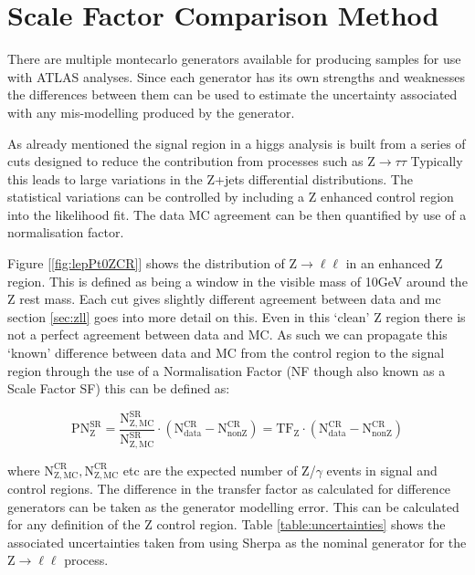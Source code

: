 \section{Scale Factor Comparison Method}
\label{sec:comparison}

There are multiple montecarlo generators available for producing samples for use with ATLAS analyses. Since each generator has its own strengths and weaknesses the differences between them can be used to estimate the uncertainty associated with any mis-modelling produced by the generator.

As already mentioned the signal region in a higgs analysis is built from a series of cuts designed to reduce the contribution from processes such as Z$\rightarrow\tau\tau$ Typically this leads to large variations in the Z+jets differential distributions. The statistical variations can be controlled by including a Z enhanced control region into the likelihood fit. The data MC agreement can be then quantified by use of a normalisation factor. 

Figure [\ref{fig:lepPt0ZCR}] shows the distribution of Z$\rightarrow\ell\ell$ in an enhanced Z region. This is defined as being a window in the visible mass of 10GeV around the Z rest mass. Each cut gives slightly different agreement between data and mc section \ref{sec:zll} goes into more detail on this. Even in this `clean' Z region there is not a perfect agreement between data and MC. As such we can propagate this `known' difference between data and MC from the control region to the signal region through the use of a Normalisation Factor (NF though also known as a Scale Factor SF) this can be defined as:

\begin{equation}
\mathrm{PN^{SR}_{Z}=\frac{N^{SR}_{Z,MC}}{N^{SR}_{Z,MC}}\cdot(N^{CR}_{data}-N^{CR}_{nonZ})=TF_{Z}\cdot(N^{CR}_{data}-N^{CR}_{nonZ})}
\end{equation}

where $\mathrm{N^{CR}_{Z,MC},N^{CR}_{Z,MC}}$ etc are the expected number of Z/$\gamma$ events in signal and control regions. The difference in the transfer factor as calculated for difference generators can be taken as the generator modelling error. This can be calculated for any definition of the Z control region. Table \ref{table:uncertainties} shows the associated uncertainties taken from using Sherpa as the nominal generator for the Z$\rightarrow\ell\ell$ process. 


